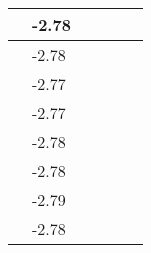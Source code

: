 \documentclass[a4paper,11pt]{report}
\begin{document}
\begin{table}[H]
\begin{center}
\begin{tabular}{|l|l|l|l|l|l|}
\hline
\hspace*{0.5cm}&\hspace*{0.5cm}-2.78&\hspace*{0.5cm}&\hspace*{0.5cm}&\hspace*{0.5cm}\\
\hline
\hspace*{0.5cm}&\hspace*{0.5cm}-2.78&\hspace*{0.5cm}&\hspace*{0.5cm}&\hspace*{0.5cm}\\
\hline
\hspace*{0.5cm}&\hspace*{0.5cm}-2.77&\hspace*{0.5cm}&\hspace*{0.5cm}&\hspace*{0.5cm}\\
\hline
\hspace*{0.5cm}&\hspace*{0.5cm}-2.77&\hspace*{0.5cm}&\hspace*{0.5cm}&\hspace*{0.5cm}\\
\hline
\hspace*{0.5cm}&\hspace*{0.5cm}-2.78&\hspace*{0.5cm}&\hspace*{0.5cm}&\hspace*{0.5cm}\\
\hline
\hspace*{0.5cm}&\hspace*{0.5cm}-2.78&\hspace*{0.5cm}&\hspace*{0.5cm}&\hspace*{0.5cm}\\
\hline
\hspace*{0.5cm}&\hspace*{0.5cm}-2.79&\hspace*{0.5cm}&\hspace*{0.5cm}&\hspace*{0.5cm}\\
\hline
\hspace*{0.5cm}&\hspace*{0.5cm}-2.78&\hspace*{0.5cm}&\hspace*{0.5cm}&\hspace*{0.5cm}\\
\hline
\end{tabular}
\label{table7}
\end{center}
\end{table}
\end{document}
